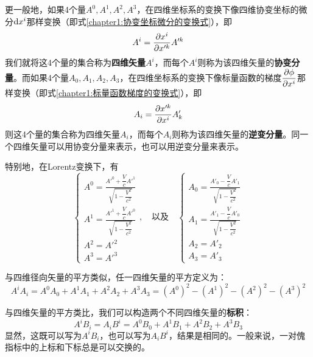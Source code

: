 更一般地，如果4个量$A^0,A^1,A^2,A^3$，在四维坐标系的变换下像四维协变坐标的微分$\mathrm{d} x^i$那样变换（即式\eqref{chapter1:协变坐标微分的变换式}），即
\begin{equation}
	A^i = \frac{\partial x^i}{\partial x'^k} A'^k
	\label{chapter1:四维矢量协变分量的变换关系式}
\end{equation}
我们就将这4个量的集合称为{\bf 四维矢量}$A^i$，而每个$A^i$则称为该四维矢量的{\bf 协变分量}。而如果4个量$A_0,A_1,A_2,A_3$，在四维坐标系的变换下像标量函数的梯度$\dfrac{\partial \phi}{\partial x^i}$那样变换（即式\eqref{chapter1:标量函数梯度的变换式}），即
\begin{equation}
	A_i = \frac{\partial x'^k}{\partial x^i} A'_k
	\label{chapter1:四维矢量逆变分量的变换关系式}
\end{equation}
则这4个量的集合称为四维矢量$A_i$，而每个$A_i$则称为该四维矢量的{\bf 逆变分量}。同一个四维矢量可以用协变分量来表示，也可以用逆变分量来表示。

特别地，在Lorentz变换下，有
\begin{equation}
\begin{cases}
	\displaystyle A^0 = \frac{A'^0+\dfrac{V}{c}A'^1}{\sqrt{1-\dfrac{V^2}{c^2}}} \\[1.5ex]
	\displaystyle A^1 = \frac{A'^1+\dfrac{V}{c}A'^0}{\sqrt{1-\dfrac{V^2}{c^2}}} \\[1.5ex]
	A^2 = A'^2 \\[1.5ex]
	A^3 = A'^3 
\end{cases},\quad \text{以及}\quad
\begin{cases}
	\displaystyle A_0 = \frac{A'_0-\dfrac{V}{c}A'_1}{\sqrt{1-\dfrac{V^2}{c^2}}} \\[1.5ex]
	\displaystyle A_1 = \frac{A'_1-\dfrac{V}{c}A'_0}{\sqrt{1-\dfrac{V^2}{c^2}}} \\[1.5ex]
	A_2 = A'_2 \\[1.5ex]
	A_3 = A'_3 
\end{cases}
\end{equation}

与四维径向矢量的平方类似，任一四维矢量的平方定义为：
\begin{equation*}
	A^iA_i = A^0A_0 + A^1A_1 + A^2A_2 + A^3A_3 = (A^0)^2-(A^1)^2-(A^2)^2-(A^3)^2
\end{equation*}

与四维矢量的平方类比，我们可以构造两个不同四维矢量的{\bf 标积}：
\begin{equation*}
	A^iB_i = A_iB^i = A^0B_0+A^1B_1+A^2B_2+A^3B_3
\end{equation*}
显然，这既可以写为$A^iB_i$，也可以写为$A_iB^i$，结果是相同的。一般来说，一对傀指标中的上标和下标总是可以交换的。

